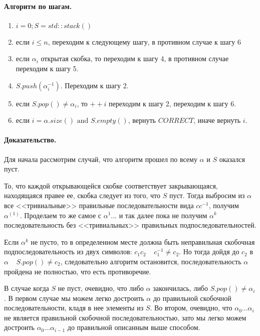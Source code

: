 \documentclass[12pt]{article}
\begin{document}
\paragraph{Алгоритм по шагам.}
\begin{enumerate}
    \item $i = 0; S = std::stack() $
    \item если $ i \le n $, переходим к следующему шагу, в противном случае к шагу 6
    \item если $ \alpha_i $ открытая скобка, то переходим к шагу 4, в противном случае переходим к шагу 5.
    \item $ S.push(\alpha_i^{-1}) $. Переходим к шагу 2.
    \item если $ S.pop() \ne \alpha_i $, то $ ++i $ переходим к шагу 2, переходим к шагу 6.
    \item если $ i = \alpha.size() \mbox{ and } S.empty() $, вернуть $ CORRECT $, иначе вернуть $ i $.
\end{enumerate}


\paragraph{Доказательство.}
Для начала рассмотрим случай, что алгоритм прошел по всему $ \alpha $ и $ S $ оказался пуст.

То, что каждой открывающейся скобке соответствует закрывающаяся, находящаяся правее ее, скобка следует
из того, что $ S $ пуст. Тогда выбросим из $ \alpha $ все <<тривиальные>> правильные последовательности вида
$cc^{-1}$, получим $ \alpha^{(1)} $. 
Проделаем то же самое с $ \alpha^{1} $... и так далее пока не получим
$ \alpha^{k} $ последовательность без <<тривиальных>> правильных подпоследовательностей. 

Если $ \alpha^{k} $ не пусто, то в определенном месте должна быть неправильная скобочная подпоследовательность из двух символов:
$ c_1c_2 \;\;\;\; c_1^{-1} \ne c_2 $. Но тогда дойдя до $ c_2 $ в $ \alpha \;\;\;\; S.pop() \ne c_2 $, следовательно
алгоритм остановится, последовательность $ \alpha $ пройдена не полностью, что есть противоречие.

В случае когда $ S $ не пуст, очевидно, что либо $ \alpha $ закончилась, либо $ S.pop() \ne \alpha_i $. В первом случае
мы можем легко достроить $ \alpha $ до правильной скобочной последовательности, кладя в нее элементы из $ S $. Во втором,
очевидно, что $ \alpha_0\dots \alpha_i $ не является правильной скобочной последовательностью, зато мы легко можем
достроить $ \alpha_0\dots \alpha_{i-1} $ до правильной описанным выше способом. 
\end{document}
